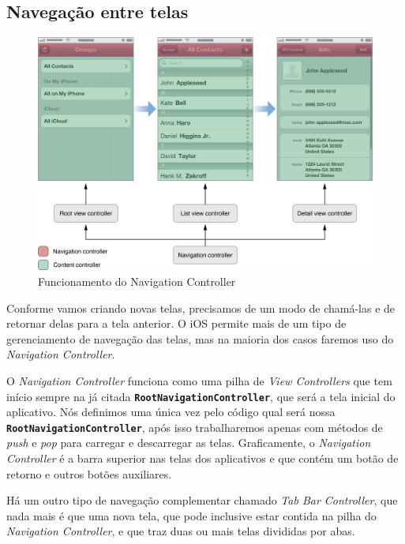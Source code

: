 \documentclass[a4paper,12pt,brazil,doubleside]{book}
\begin{document}
\begin{singlespace}
\subsection{Navegação entre telas}

\begin{figure}[h]
  \centering
  \includegraphics[width=\textwidth]{figuras/apple_navigation_interface.png}
  \caption{Funcionamento do Navigation Controller}
  \label{fig:a}
\end{figure}

Conforme vamos criando novas telas, precisamos de um modo de chamá-las e de retornar delas para a tela anterior. O iOS permite mais de um tipo de gerenciamento de navegação das telas, mas na maioria dos casos faremos uso do \emph{Navigation Controller}.

O \emph{Navigation Controller} funciona como uma pilha de \emph{View Controllers} que tem início sempre na já citada \texttt{\textbf{RootNavigationController}}, que será a tela inicial do aplicativo. Nós definimos uma única vez pelo código qual será nossa \texttt{\textbf{RootNavigationController}}, após isso trabalharemos apenas com métodos de \emph{push} e \emph{pop} para carregar e descarregar as telas. Graficamente, o \emph{Navigation Controller} é a barra superior nas telas dos aplicativos e que contém um botão de retorno e outros botões auxiliares.

Há um outro tipo de navegação complementar chamado \emph{Tab Bar Controller}, que nada mais é que uma nova tela, que pode inclusive estar contida na pilha do \emph{Navigation Controller}, e que traz duas ou mais telas divididas por abas.


\end{singlespace}
\end{document}
